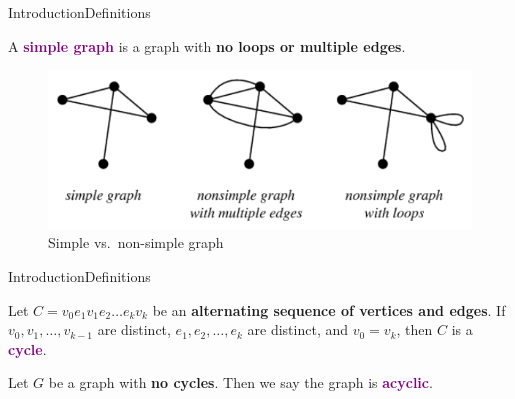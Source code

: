\documentclass[10pt]{beamer}
\theoremstyle{definition}
\newcommand{\Sone}{Introduction}
\newcommand{\SoneSSdefinitions}{Definitions}
\newcommand{\DefColor}{purple}
\begin{document}
\begin{frame}{\Sone}{\SoneSSdefinitions}

\begin{definition}
A \textbf{\textcolor{\DefColor}{simple graph}} is a graph with \textbf{no loops or multiple edges}.
\end{definition}

\begin{figure}
  \includegraphics[width=\linewidth]{images/section1_simple.png}
  \caption{Simple vs.\ non-simple graph}
  \label{fig:section1_simple}
\end{figure}

\end{frame}

\begin{frame}{\Sone}{\SoneSSdefinitions}
\begin{definition}
Let $C=v_{0}e_{1}v_{1}e_{2}\ldots e_{k}v_{k}$ be an \textbf{alternating sequence of vertices and edges}. If $v_{0}, v_{1}, \ldots, v_{k-1}$ are distinct, $e_{1}, e_{2}, \ldots, e_{k}$ are distinct, and $v_{0}=v_{k}$, then $C$ is a \textbf{\textcolor{\DefColor}{cycle}}.
\end{definition}

\pause{}

\begin{definition}
Let $G$ be a graph with \textbf{no cycles}. Then we say the graph is \textbf{\textcolor{\DefColor}{acyclic}}.
\end{definition}

\end{frame}
\end{document}
